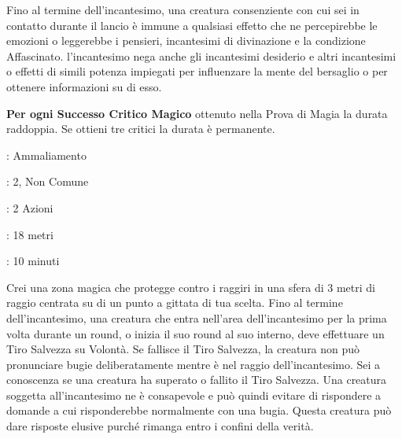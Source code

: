 \begin{multicols}{2}
Fino al termine dell'incantesimo, una creatura consenziente con cui sei in contatto durante il lancio è immune a qualsiasi effetto che ne percepirebbe le emozioni o leggerebbe i pensieri, incantesimi di divinazione e la condizione Affascinato. l'incantesimo nega anche gli incantesimi desiderio e altri incantesimi o effetti di simili potenza impiegati per
influenzare la mente del bersaglio o per ottenere informazioni su di esso.

\textbf{Per ogni Successo Critico Magico} ottenuto nella Prova di Magia la durata raddoppia. Se ottieni tre critici la durata è permanente.

\noindent\colorbox{OBSSgold!10}{
\begin{minipage}{0.95\linewidth}
\begin{description}[noitemsep, topsep=0pt, parsep=0pt, partopsep=0pt, leftmargin=0cm, labelwidth=1.3cm]
	\item[\textbf{Lista}]: Ammaliamento
	\item[\textbf{Livello}]: 2, Non Comune
	\item[\textbf{Lancio}]: 2 Azioni
	\item[\textbf{Gittata}]: 18 metri
	\item[\textbf{Durata}]: 10 minuti
\end{description}
\end{minipage}}\smallskip

Crei una zona magica che protegge contro i raggiri in una sfera di 3 metri di raggio centrata su di un punto a gittata di tua scelta. Fino al termine dell'incantesimo, una creatura che entra nell'area dell'incantesimo per la prima volta durante un round, o inizia il suo round al suo interno, deve effettuare un Tiro Salvezza su Volontà. Se fallisce il Tiro Salvezza, la creatura non può pronunciare bugie deliberatamente mentre è nel raggio dell'incantesimo. Sei a conoscenza se una creatura ha superato o fallito il Tiro Salvezza. Una creatura soggetta all'incantesimo ne è consapevole e può quindi evitare di rispondere a domande a cui risponderebbe normalmente con una bugia. Questa creatura può dare risposte elusive purché rimanga entro i confini della verità.


\bigskip


\end{multicols}

